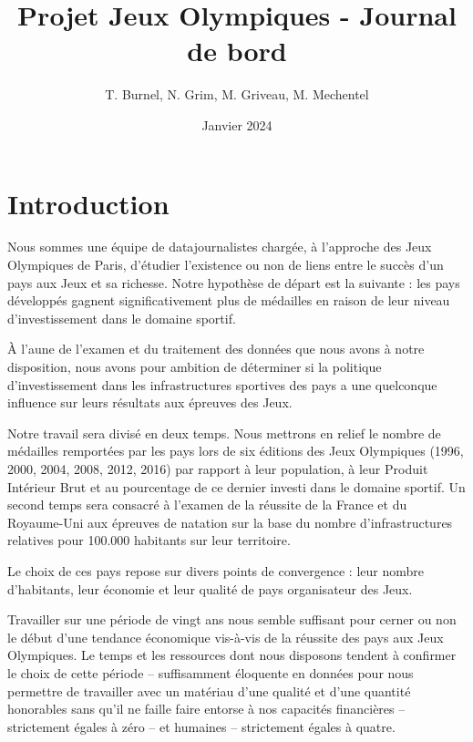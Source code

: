 \documentclass[hidelinks, 12pt]{report}
\title{Projet Jeux Olympiques - Journal de bord}
\date{Janvier 2024}
\author{T. Burnel, N. Grim, M. Griveau, M. Mechentel}
\begin{document}
\maketitle





%




\chapter{Introduction}

Nous sommes une équipe de datajournalistes chargée, à l'approche des Jeux Olympiques de Paris, d'étudier l'existence ou non de liens entre le succès d'un pays aux Jeux et sa richesse. Notre hypothèse de départ est la suivante : les pays développés gagnent significativement plus de médailles en raison de leur niveau d'investissement dans le domaine sportif. 

À l'aune de l'examen et du traitement des données que nous avons à notre disposition, nous avons pour ambition de déterminer si la politique d'investissement dans les infrastructures sportives des pays a une quelconque influence sur leurs résultats aux épreuves des Jeux.

Notre travail sera divisé en deux temps. Nous mettrons en relief le nombre de médailles remportées par les pays lors de six éditions des Jeux Olympiques (1996, 2000, 2004, 2008, 2012, 2016) par rapport à leur population, à leur Produit Intérieur Brut et au pourcentage de ce dernier investi dans le domaine sportif. Un second temps sera consacré à l'examen de la réussite de la France et du Royaume-Uni aux épreuves de natation sur la base du nombre d'infrastructures relatives pour 100.000 habitants sur leur territoire.

Le choix de ces pays repose sur divers points de convergence : leur nombre d'habitants, leur économie et leur qualité de pays organisateur des Jeux. 

Travailler sur une période de vingt ans nous semble suffisant pour cerner ou non le début d'une tendance économique vis-à-vis de la réussite des pays aux Jeux Olympiques. Le temps et les ressources dont nous disposons tendent à confirmer le choix de cette période -- suffisamment éloquente en données pour nous permettre de travailler avec un matériau d'une qualité et d'une quantité honorables sans qu'il ne faille faire entorse à nos capacités financières -- strictement égales à zéro -- et humaines -- strictement égales à quatre.
\end{document}
